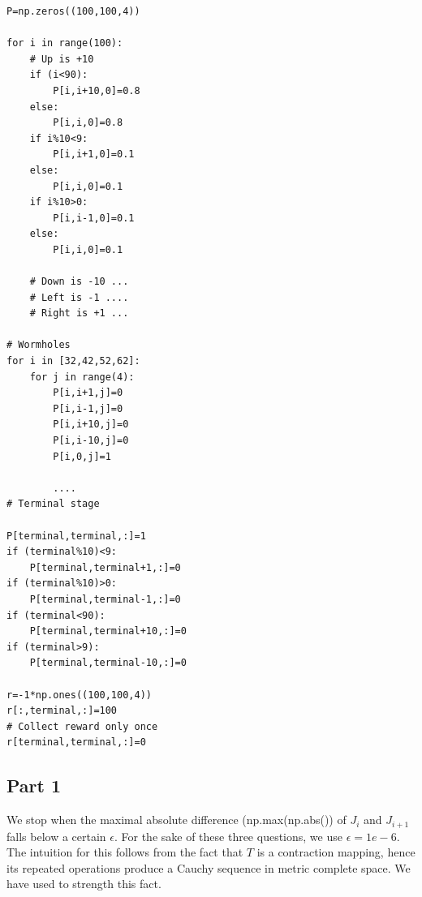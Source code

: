 \begin{lstlisting}
P=np.zeros((100,100,4))

for i in range(100):
    # Up is +10
    if (i<90):
        P[i,i+10,0]=0.8
    else:
        P[i,i,0]=0.8
    if i%10<9:
        P[i,i+1,0]=0.1
    else:
        P[i,i,0]=0.1
    if i%10>0:
        P[i,i-1,0]=0.1
    else:
        P[i,i,0]=0.1

    # Down is -10 ...
    # Left is -1 ....
    # Right is +1 ...
    
# Wormholes
for i in [32,42,52,62]:
    for j in range(4):
        P[i,i+1,j]=0
        P[i,i-1,j]=0
        P[i,i+10,j]=0
        P[i,i-10,j]=0
        P[i,0,j]=1
        
        ....
# Terminal stage

P[terminal,terminal,:]=1
if (terminal%10)<9:
    P[terminal,terminal+1,:]=0
if (terminal%10)>0:
    P[terminal,terminal-1,:]=0
if (terminal<90):
    P[terminal,terminal+10,:]=0
if (terminal>9):
    P[terminal,terminal-10,:]=0

r=-1*np.ones((100,100,4))
r[:,terminal,:]=100
# Collect reward only once
r[terminal,terminal,:]=0
\end{lstlisting}

\subsection{Part 1}

We stop when the maximal absolute difference (np.max(np.abs()) of $J_i$ and $J_{i+1}$ falls below a certain $\epsilon$. For the sake of these three questions, we use $\epsilon = 1e-6$. \\

The intuition for this follows from the fact that $T$ is a contraction mapping, hence its repeated operations produce a Cauchy sequence in metric complete space. We have used to strength this fact.

